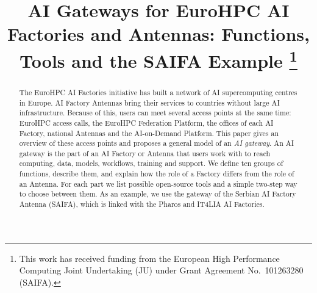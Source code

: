 \documentclass[conference,a4paper]{IEEEtran}
\begin{document}
\title{AI Gateways for EuroHPC AI Factories and Antennas: Functions, Tools and the SAIFA Example%
\thanks{This work has received funding from the European High Performance Computing Joint Undertaking (JU) under Grant Agreement No.~101263280 (SAIFA).}}

\author{
\and
{}
\and
{}
}

\maketitle
{}

\begin{abstract}
The EuroHPC AI Factories initiative has built a network of AI supercomputing centres in Europe. AI Factory Antennas bring their services to countries without large AI infrastructure. Because of this, users can meet several access points at the same time: EuroHPC access calls, the EuroHPC Federation Platform, the offices of each AI Factory, national Antennas and the AI-on-Demand Platform. This paper gives an overview of these access points and proposes a general model of an \emph{AI gateway}. An AI gateway is the part of an AI Factory or Antenna that users work with to reach computing, data, models, workflows, training and support. We define ten groups of functions, describe them, and explain how the role of a Factory differs from the role of an Antenna. For each part we list possible open-source tools and a simple two-step way to choose between them. As an example, we use the gateway of the Serbian AI Factory Antenna (SAIFA), which is linked with the Pharos and IT4LIA AI Factories.
\end{abstract}
\end{document}
